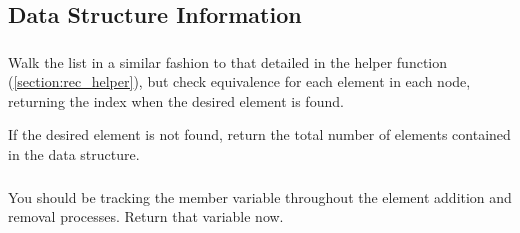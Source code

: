 \subsection{Data Structure Information}

\subsubsection{}
Walk the list in a similar fashion to that detailed in the 
helper function (\ref{section:rec_helper}), but check equivalence for each element in each node,
returning the index when the desired element is found.

If the desired element is not found, return the total number of elements
contained in the data structure.

\subsubsection{}
You should be tracking the  member variable throughout the element
addition and removal processes. Return that variable now.
